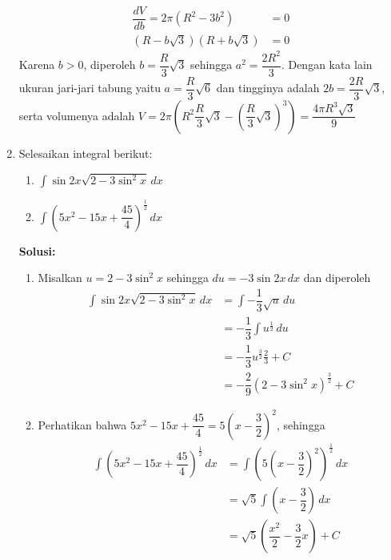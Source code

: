 \documentclass{article}
\begin{document}
\begin{enumerate}
	 \begin{align*}
	 \dfrac{dV}{db} = 2\pi (R^2-3b^2) &= 0 \\
	 (R-b\sqrt{3})(R+b\sqrt{3}) &=0
	 \end{align*}
	 Karena $b>0$, diperoleh $b=\dfrac{R}{3}\sqrt{3}$ sehingga $a^2=\dfrac{2R^2}{3}$. Dengan kata lain ukuran jari-jari tabung yaitu $a=\dfrac{R}{3}\sqrt{6}$ dan tingginya adalah $2b=\dfrac{2R}{3}\sqrt{3}$, serta volumenya adalah $V=2\pi \left(R^2\dfrac{R}{3}\sqrt{3}-\left(\dfrac{R}{3}\sqrt{3}\right)^3\right) = \dfrac{4\pi R^3\sqrt{3}}{9}$
	 \item Selesaikan integral berikut:
	 \begin{enumerate}
	 	\item $\displaystyle \int \sin 2x\sqrt{2-3\sin^2 x} \, dx$
	 	\item $\displaystyle \int \left(5x^2-15x+\dfrac{45}{4}\right)^{\frac{1}{2}} \, dx$
	 \end{enumerate}
	 \textbf{Solusi:}
	 \begin{enumerate}
	 	\item Misalkan $u=2-3\sin^2 x$ sehingga $du = -3\sin 2x \, dx$ dan diperoleh 
	 	\begin{align*}
	 	\int \sin 2x\sqrt{2-3\sin^2x} \, dx &= \int -\dfrac{1}{3}\sqrt{u} \, du \\
	 	&=  -\dfrac{1}{3} \int u^{\frac{1}{2}} \, du \\
	 	&= -\dfrac{1}{3}u^{\frac{3}{2}}\frac{2}{3} +C \\
		&= -\dfrac{2}{9}(2-3\sin^2x)^{\frac{3}{2}} + C
	 	\end{align*}
	 	\item Perhatikan bahwa $5x^2-15x+\dfrac{45}{4}=5\left(x-\dfrac{3}{2}\right)^2$, sehingga
	 	\begin{align*}
	 	\int \left(5x^2-15x+\dfrac{45}{4}\right)^{\frac{1}{2}} \, dx &= \int \left(5\left(x-\dfrac{3}{2}\right)^2\right)^{\frac{1}{2}} \, dx \\
	 	&= \sqrt{5}\int \left(x-\dfrac{3}{2}\right) \, dx \\
	 	&= \sqrt{5}\left(\dfrac{x^2}{2}-\dfrac{3}{2}x\right) +C  
	 	\end{align*}
	 \end{enumerate}
\end{enumerate}
\newpage
\end{document}
